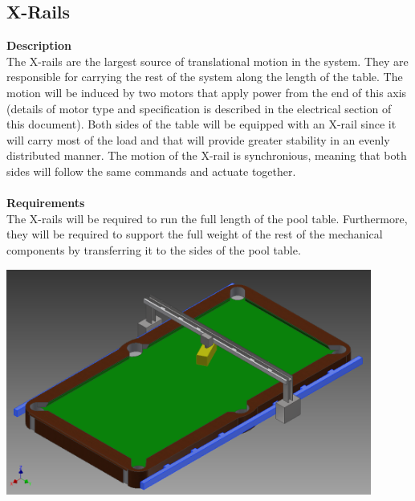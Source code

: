 \documentclass[titlepage]{article}
\begin{document}
\subsection{X-Rails}
\textbf{Description}\\
The X-rails are the largest source of translational motion in the system. They are responsible for carrying the rest of the system along the length of the table. The motion will be induced by two motors that apply power from the end of this axis (details of motor type and specification is described in the electrical section of this document). Both sides of the table will be equipped with an X-rail since it will carry most of the load and that will provide greater stability in an evenly distributed manner. The motion of the X-rail is synchronious, meaning that both sides will follow the same commands and actuate together.\\\\
\textbf{Requirements}\\
The X-rails will be required to run the full length of the pool table. Furthermore, they will be required to support the full weight of the rest of the mechanical components by transferring it to the sides of the pool table.
\begin{center}
	\includegraphics[width = 0.9\textwidth]{xRails1.png}	%
\label{fig:xRailFig}
\end{center}


\end{document}
